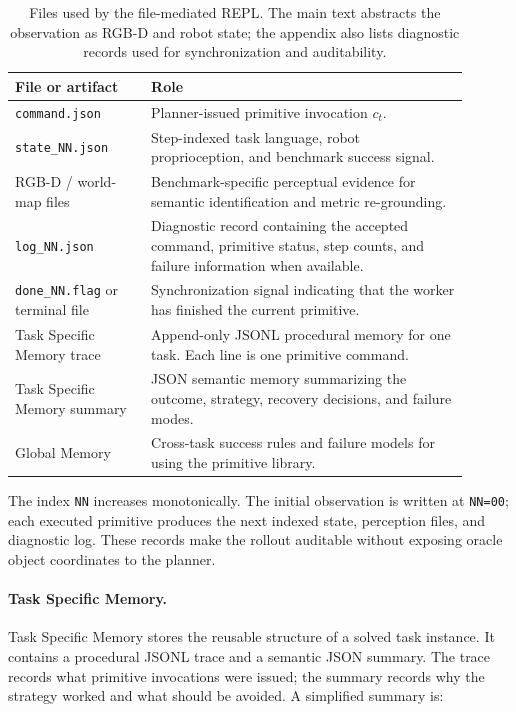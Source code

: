 \documentclass{article}
\begin{document}
  \begin{table}[h]
  \centering
  \caption{Files used by the file-mediated REPL. The main text abstracts the observation
  as RGB-D and robot state; the appendix also lists diagnostic records used for
  synchronization and auditability.}
  \label{tab:app_repl_files}
  \small
  \setlength{\tabcolsep}{4pt}
  \begin{tabular}{p{0.27\linewidth}p{0.63\linewidth}}
  \toprule
  File or artifact & Role \\
  \midrule
  \texttt{command.json} &
  Planner-issued primitive invocation $c_t$. \\
  \texttt{state\_NN.json} &
  Step-indexed task language, robot proprioception, and benchmark success signal. \\
  RGB-D / world-map files &
  Benchmark-specific perceptual evidence for semantic identification and metric
  re-grounding. \\
  \texttt{log\_NN.json} &
  Diagnostic record containing the accepted command, primitive status, step counts, and
  failure information when available. \\
  \texttt{done\_NN.flag} or terminal file &
  Synchronization signal indicating that the worker has finished the current primitive. \\
  Task Specific Memory trace &
  Append-only JSONL procedural memory for one task. Each line is one primitive command. \\
  Task Specific Memory summary &
  JSON semantic memory summarizing the outcome, strategy, recovery decisions, and
  failure modes. \\
  Global Memory &
  Cross-task success rules and failure models for using the primitive library. \\
  \bottomrule
  \end{tabular}
  \end{table}

  The index \texttt{NN} increases monotonically. The initial observation is written at
  \texttt{NN=00}; each executed primitive produces the next indexed state, perception
  files, and diagnostic log. These records make the rollout auditable without exposing
  oracle object coordinates to the planner.

  \paragraph{Task Specific Memory.}
  Task Specific Memory stores the reusable structure of a solved task instance. It
  contains a procedural JSONL trace and a semantic JSON summary. The trace records what
  primitive invocations were issued; the summary records why the strategy worked and
  what should be avoided. A simplified summary is:
\end{document}
